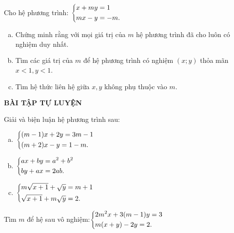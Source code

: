 \begin{vd}%
Cho hệ phương trình: $\left\{\begin{aligned}&x+my=1\\&mx-y=-m.\end{aligned}\right.$
\begin{enumerate}[a)]
\item Chứng minh rằng với mọi giá trị của $m$ hệ phương trình đã cho luôn có nghiệm duy nhất.
\item Tìm các giá trị của $m$ để hệ phương trình có nghiệm $(x;y)$ thỏa mãn $x<1,y<1$.
\item Tìm hệ thức liên hệ giữa $x,y$ không phụ thuộc vào $m$.
\end{enumerate}
\end{vd}
\begin{center}
\textbf{BÀI TẬP TỰ LUYỆN }
\end{center}
\begin{bt}%
Giải và biện luận hệ phương trình sau:\begin{enumerate}[a)]
\item $\left\{\begin{aligned}&(m-1)x+2y=3m-1\\&(m+2)x-y=1-m.\end{aligned}\right.$
\item $\left\{\begin{aligned}&ax+by=a^2+b^2\\&by+ax=2ab.\end{aligned}\right.$
\item $\left\{\begin{aligned}&m\sqrt{x+1}+\sqrt{y}=m+1\\&\sqrt{x+1}+m\sqrt{y}=2.\end{aligned}\right.$
\end{enumerate}
\end{bt}
\begin{bt}%
Tìm $m$ để hệ sau vô nghiệm:$\left\{\begin{aligned}&2m^2x+3(m-1)y=3\\&m(x+y)-2y=2.\end{aligned}\right.$
\end{bt}

